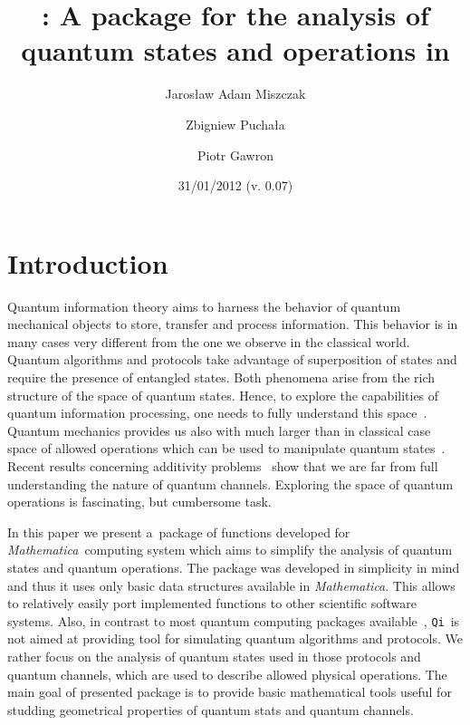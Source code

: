 \documentclass[11pt,a4paper]{article}
\date{31/01/2012 (v. 0.07)}
\title{\qi: A package for the analysis of quantum states and operations in
\Mathematica}
\author{Jarosław Adam Miszczak \and Zbigniew Pucha\l{}a \and Piotr Gawron}
\newcommand{\qi}{\texttt{Qi}}
\newcommand{\Mathematica}{\emph{Mathematica}}
\newcommand{\1}{{\bf 1}}
\begin{document}
\maketitle

\begin{abstract}
\end{abstract}

\section{Introduction}
Quantum information theory aims to harness the behavior of quantum mechanical
objects to store, transfer and process information. This behavior is in many
cases very different from the one we observe in the classical world. Quantum
algorithms and protocols take advantage of superposition of states and require
the presence of entangled states. Both phenomena arise from the rich structure
of the space of quantum states. Hence, to explore the capabilities of quantum
information processing, one needs to fully understand this space~\cite{BZ06}.
Quantum mechanics provides us also with much larger than in classical case space
of allowed operations which can be used to manipulate quantum
states~\cite{BZ06}. Recent results concerning additivity
problems~\cite{hastings09superadditivity} show that we are far from full
understanding the nature of quantum channels. Exploring the space of quantum
operations is fascinating, but cumbersome task.

In this paper we present a~package of functions developed for \Mathematica\
computing system which aims to simplify the analysis of quantum states and
quantum operations. The package was developed in simplicity in mind and thus it
uses only basic data structures available in \Mathematica. This allows to
relatively easily port implemented functions to other scientific software
systems. Also, in contrast to most quantum computing packages
available~\cite{quantum2, qdensity, qcwave, qucalc}, \qi\ is not aimed at
providing tool for simulating quantum algorithms and protocols. We rather focus
on the analysis of quantum states used in those protocols and quantum channels,
which are used to describe allowed physical operations. The main goal of
presented package is to provide basic mathematical tools useful for studding
geometrical properties of quantum stats and quantum channels.
\end{document}

